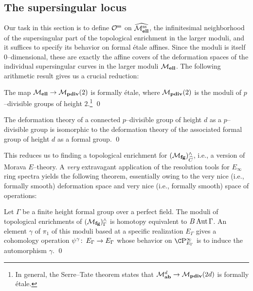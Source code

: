 \subsection*{The supersingular locus}

Our task in this section is to define $\mathcal{O}^{\mathrm{ss}}$ on $\widehat{\mathcal{M}_{\mathbf{ell}}^{\mathrm{ss}}}$, the infinitesimal neighborhood of the supersingular part of the topological enrichment in the larger moduli, and it suffices to specify its behavior on formal \'etale affines.  Since the moduli is itself $0$--dimensional, these are exactly the affine covers of the deformation spaces of the individual supersingular curves in the larger moduli $\mathcal{M}_{\mathbf{ell}}$.  The following arithmetic result gives us a crucial reduction:

\begin{theorem}
The map $\mathcal{M}_{\mathbf{ell}} \to \mathcal{M}_{\mathbf{pdiv}}(2)$ is formally \'etale, where $\mathcal{M}_{\mathbf{pdiv}}(2)$ is the moduli of $p$--divisible groups of height $2$.\footnote{In general, the Serre--Tate theorem states that $\mathcal{M}_{\mathbf{ab}}^{d} \to \mathcal{M}_{\mathbf{pdiv}}(2d)$ is formally \'etale.} \qed
\end{theorem}
\begin{lemma}
The deformation theory of a connected $p$--divisible group of height $d$ as a $p$--divisible group is isomorphic to the deformation theory of the associated formal group of height $d$ as a formal group. \qed
\end{lemma}

This reduces us to finding a topological enrichment for $(\mathcal{M}_{\mathbf{fg}})^\wedge_{\widehat{C}}$, i.e., a version of Morava $E$--theory.  A \emph{very} extravagant application of the resolution tools for $E_\infty$ ring spectra yields the following theorem, essentially owing to the very nice (i.e., formally smooth) deformation space and very nice (i.e., formally smooth) space of operations:

\begin{theorem}\label{GHMTheoremForEThy}
Let $\Gamma$ be a finite height formal group over a perfect field.  The moduli of topological enrichments of $(\mathcal{M}_{\mathbf{fg}})^\wedge_\Gamma$ is homotopy equivalent to $B\operatorname{Aut} \Gamma$.  An element $\gamma$ of $\pi_1$ of this moduli based at a specific realization $E_\Gamma$ gives a cohomology operation $\psi^\gamma\colon\thinspace E_\Gamma \to E_\Gamma$ whose behavior on $\CP^\infty_{E_\Gamma}$ is to induce the automorphism $\gamma$. \qed
\end{theorem}

